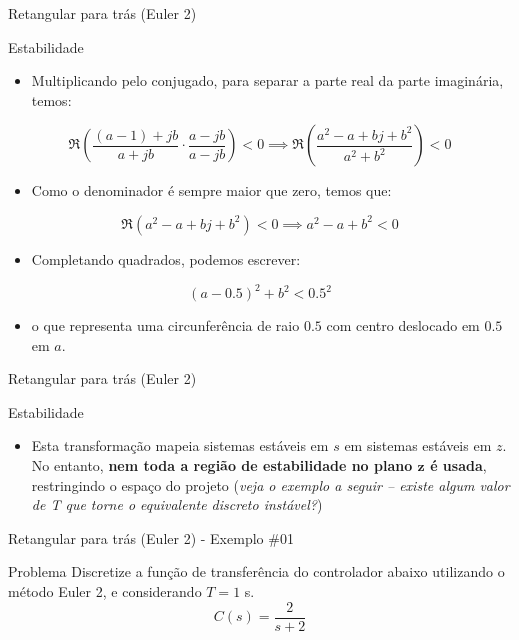 \begin{frame}{Retangular para trás (Euler 2)}
\begin{block}{Estabilidade}
\begin{itemize}
\item[] Multiplicando pelo conjugado, para separar a parte real da parte imaginária, temos:
\end{itemize}
$$\Re \left(\dfrac{(a-1)+jb}{a+jb} \cdot \dfrac{a-jb}{a-jb}\right) < 0 \implies \Re \left(\dfrac{a^2-a+bj+b^2}{a^2+b^2}\right) < 0$$
\begin{itemize}
\item[] Como o denominador é sempre maior que zero, temos que:
\end{itemize}
$$\Re (a^2-a+bj+b^2) < 0 \implies a^2-a+b^2 < 0$$
\begin{itemize}
\item[] Completando quadrados, podemos escrever:
\end{itemize}
$$(a-\num{0,5})^2+b^2 < \num{0,5}^2$$
\begin{itemize}
\vspace{-0.3cm}
\item[] o que representa uma circunferência de raio $\num{0,5}$ com centro deslocado em $\num{0,5}$ em $a$.
\end{itemize}
\end{block}
\end{frame}

\begin{frame}{Retangular para trás (Euler 2)}
\begin{block}{Estabilidade}
\begin{itemize}
	    \item Esta transformação mapeia sistemas estáveis em $ s $ em sistemas estáveis em $ z $. No entanto, \textbf{nem toda a região de estabilidade no plano $\bm{z}$ é usada}, restringindo o espaço do projeto (\textit{veja o exemplo a seguir -- existe algum valor de T que torne o equivalente discreto instável?})
\end{itemize}
\end{block}
\centering
\vspace{0.2cm}
\scalebox{0.8}{}
\end{frame}


\begin{frame}{Retangular para trás (Euler 2) - Exemplo \#01}
\begin{block}{Problema}
Discretize a função de transferência do controlador abaixo utilizando o método Euler 2, e considerando $T= \num{1}$ s.
	\[ C(s)=\dfrac{2}{s+2} \]
\end{block}
\end{frame}


